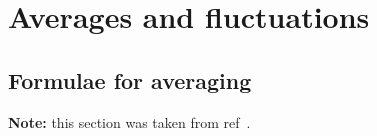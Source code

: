 %
% 
% 
% 
% 
% 
% 
% 
% 
%

%
%
\chapter{Averages and fluctuations}
\section{Formulae for averaging}
{\bf Note:} this section was taken from ref~\cite{Gunsteren94a}.

